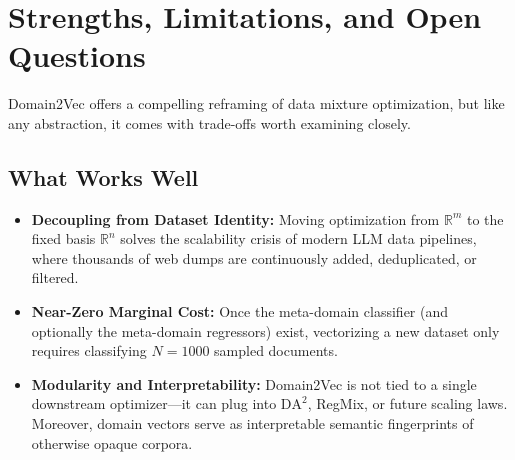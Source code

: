 \documentclass[12pt]{article}
\begin{document}
\section*{Strengths, Limitations, and Open Questions}

Domain2Vec offers a compelling reframing of data mixture optimization, but like any abstraction, it comes with trade-offs worth examining closely.

\subsection*{What Works Well}
\begin{itemize}
    \item \textbf{Decoupling from Dataset Identity:} Moving optimization from $\mathbb{R}^m$ to the fixed basis $\mathbb{R}^n$ solves the scalability crisis of modern LLM data pipelines, where thousands of web dumps are continuously added, deduplicated, or filtered.
    \item \textbf{Near-Zero Marginal Cost:} Once the meta-domain classifier (and optionally the meta-domain regressors) exist, vectorizing a new dataset only requires classifying $N = 1000$ sampled documents.
    \item \textbf{Modularity and Interpretability:} Domain2Vec is not tied to a single downstream optimizer—it can plug into $\mathrm{DA}^2$, RegMix, or future scaling laws. Moreover, domain vectors serve as interpretable semantic fingerprints of otherwise opaque corpora.
\end{itemize}
\end{document}
